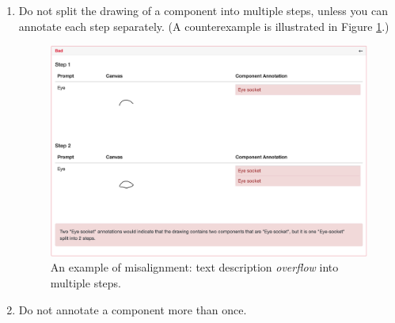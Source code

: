 \begin{enumerate}
\item Do not split the drawing of a component into multiple steps, unless you can annotate each step separately. (A counterexample is illustrated in Figure \ref{v1.requirement_1.3}.)
\begin{figure}[!h]
\centering
\includegraphics[width=.8\linewidth]{data_collection/v1_requirement1_bad2.png}  
\caption{An example of misalignment: text description \textit{overflow} into multiple steps.}
\label{v1.requirement_1.3}
\end{figure}

\item Do not annotate a component more than once.
\end{enumerate}





